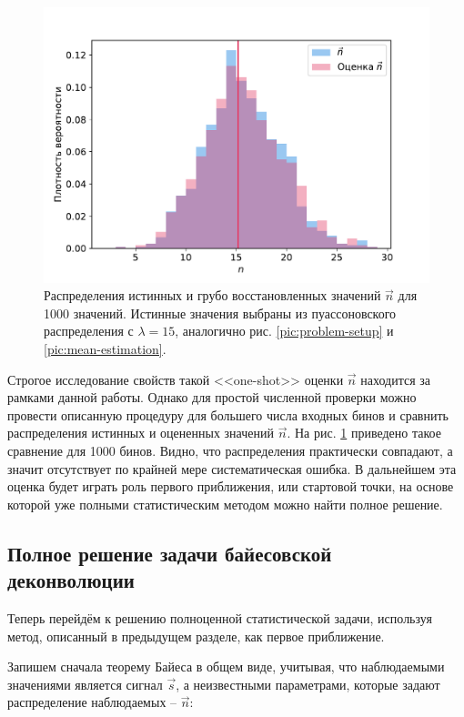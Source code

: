 \documentclass[12pt]{book}
\begin{document}
	\begin{figure}[H]
		\centering
		\includegraphics[width=\columnwidth]{mean-estimation-assessment}
		\caption{Распределения истинных и грубо восстановленных значений $\vec{n}$ для 1000 значений. Истинные значения выбраны из пуассоновского распределения с $\lambda = 15$, аналогично рис. \ref{pic:problem-setup} и \ref{pic:mean-estimation}.}
		\label{pic:mean-estimation-assessment}
	\end{figure}
	
	Строгое исследование свойств такой <<one-shot>> оценки $\vec{n}$ находится за рамками данной работы. Однако для простой численной проверки можно провести описанную процедуру для большего числа входных бинов и сравнить распределения истинных и оцененных значений $\vec{n}$. На рис. \ref{pic:mean-estimation-assessment} приведено такое сравнение для 1000 бинов. Видно, что распределения практически совпадают, а значит отсутствует по крайней мере систематическая ошибка. В дальнейшем эта оценка будет играть роль первого приближения, или стартовой точки, на основе которой уже полными статистическим методом можно найти полное решение.
	
	\subsection{Полное решение задачи байесовской деконволюции}
	
	Теперь перейдём к решению полноценной статистической задачи, используя метод, описанный в предыдущем разделе, как первое приближение.
	
	Запишем сначала теорему Байеса в общем виде, учитывая, что наблюдаемыми значениями является сигнал $\vec{s}$, а неизвестными параметрами, которые задают распределение наблюдаемых -- $\vec{n}$:
	
\end{document}
